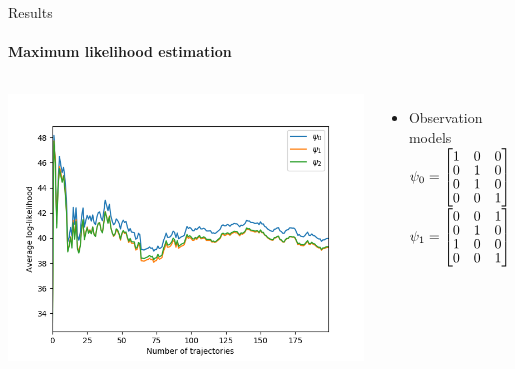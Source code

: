 \documentclass[
	english,%
	aspectratio=169,%
	color={accentcolor=3b},
	logo=true,%
	colorframetitle=false,%
	]{tudabeamer}
\begin{document}
\begin{frame}{Results}
\framesubtitle{Maximum likelihood estimation}
\begin{columns}[onlytextwidth,c]
	\includegraphics[width=\linewidth]{figures/llh_}
	\begin{itemize}
		\item Observation models \vspace{+4pt} \\
		$\psi_{0} =
		\begin{bmatrix} \vspace{-2pt}
		1 & 0 & 0 \\  \vspace{-2pt}
		0 & 1 & 0 \\  \vspace{-2pt}
		0 & 1 & 0 \\  \vspace{-1pt}
		0 & 0 & 1
		\end{bmatrix}$\\
		\vspace{+6pt}
		$\psi_{1} = 
		\begin{bmatrix} \vspace{-2pt}
		0 & 0 & 1 \\  \vspace{-2pt}
		0 & 1 & 0 \\  \vspace{-2pt}
		1 & 0 & 0 \\  \vspace{-1pt}
		0 & 0 & 1 
		\end{bmatrix} $\\

\end{itemize}
\end{columns}
\end{frame}
\end{document}
